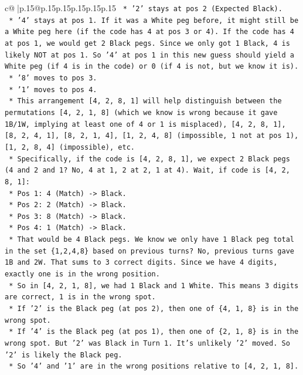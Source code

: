 \documentclass{article}
\begin{document}
{\begin{supertabular}{c@{$\;$}|p{.15\linewidth}@{}p{.15\linewidth}p{.15\linewidth}p{.15\linewidth}p{.15\linewidth}p{.15\linewidth}}
{{{\texttt{            *   '2' stays at pos 2 (Expected Black).} \\
\texttt{            *   '4' stays at pos 1. If it was a White peg before, it might still be a White peg here (if the code has 4 at pos 3 or 4). If the code has 4 at pos 1, we would get 2 Black pegs. Since we only got 1 Black, 4 is likely NOT at pos 1. So '4' at pos 1 in this new guess should yield a White peg (if 4 is in the code) or 0 (if 4 is not, but we know it is).} \\
\texttt{            *   '8' moves to pos 3.} \\
\texttt{            *   '1' moves to pos 4.} \\
\texttt{        *   This arrangement {[}4, 2, 8, 1{]} will help distinguish between the permutations {[}4, 2, 1, 8{]} (which we know is wrong because it gave 1B/1W, implying at least one of 4 or 1 is misplaced), {[}4, 2, 8, 1{]}, {[}8, 2, 4, 1{]}, {[}8, 2, 1, 4{]}, {[}1, 2, 4, 8{]} (impossible, 1 not at pos 1), {[}1, 2, 8, 4{]} (impossible), etc.} \\
\texttt{        *   Specifically, if the code is {[}4, 2, 8, 1{]}, we expect 2 Black pegs (4 and 2 and 1? No, 4 at 1, 2 at 2, 1 at 4). Wait, if code is {[}4, 2, 8, 1{]}:} \\
\texttt{            *   Pos 1: 4 (Match) {-}> Black.} \\
\texttt{            *   Pos 2: 2 (Match) {-}> Black.} \\
\texttt{            *   Pos 3: 8 (Match) {-}> Black.} \\
\texttt{            *   Pos 4: 1 (Match) {-}> Black.} \\
\texttt{            *   That would be 4 Black pegs. We know we only have 1 Black peg total in the set \{1,2,4,8\} based on previous turns? No, previous turns gave 1B and 2W. That sums to 3 correct digits. Since we have 4 digits, exactly one is in the wrong position.} \\
\texttt{            *   So in {[}4, 2, 1, 8{]}, we had 1 Black and 1 White. This means 3 digits are correct, 1 is in the wrong spot.} \\
\texttt{            *   If '2' is the Black peg (at pos 2), then one of \{4, 1, 8\} is in the wrong spot.} \\
\texttt{            *   If '4' is the Black peg (at pos 1), then one of \{2, 1, 8\} is in the wrong spot. But '2' was Black in Turn 1. It's unlikely '2' moved. So '2' is likely the Black peg.} \\
\texttt{            *   So '4' and '1' are in the wrong positions relative to {[}4, 2, 1, 8{]}.} \\
}}}
\end{supertabular}}
\end{document}
